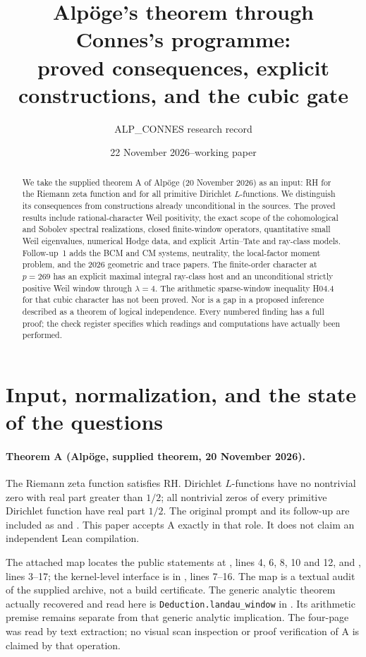 \documentclass[11pt,a4paper]{article}
\title{Alp\"oge's theorem through Connes's programme:\\
proved consequences, explicit constructions, and the cubic gate}
\author{ALP\_CONNES research record}
\date{22 November 2026\quad--\quad working paper}
\theoremstyle{definition}
\theoremstyle{remark}
\begin{document}
\maketitle
\begin{abstract}
We take the supplied theorem A of Alp\"oge (20 November 2026) as an
input: RH for the Riemann zeta function and for all primitive
Dirichlet $L$-functions. We distinguish its consequences from
constructions already unconditional in the sources. The proved
results include rational-character Weil positivity, the exact
scope of the cohomological and Sobolev spectral realizations,
closed finite-window operators, quantitative small Weil
eigenvalues, numerical Hodge data, and explicit Artin--Tate and
ray-class models. Follow-up~1 adds the BCM and CM systems,
neutrality, the local-factor moment problem, and the 2026
geometric and trace papers. The finite-order character at
$p=269$ has an explicit maximal integral ray-class host and
an unconditional strictly positive Weil window through
$\lambda=4$. The arithmetic sparse-window inequality H04.4
for that cubic character has not been proved. Nor is a
gap in a proposed inference described as a theorem of
logical independence. Every numbered finding has a full
proof; the check register specifies which readings and
computations have actually been performed.
\end{abstract}

\tableofcontents
\clearpage

\section{Input, normalization, and the state of the questions}
\label{sec:input}

\paragraph{Theorem A (Alp\"oge, supplied theorem, 20 November 2026).}
The Riemann zeta function satisfies RH. Dirichlet $L$-functions
have no nontrivial zero with real part greater than $1/2$;
all nontrivial zeros of every primitive Dirichlet function
have real part $1/2$. The original prompt and its follow-up
are included as  and
. This paper accepts A exactly in
that role. It does not claim an independent Lean compilation.

The attached map 
locates the public statements at , lines
4, 6, 8, 10 and 12, and , lines
3--17; the kernel-level interface is in
, lines 7--16.
The map is a textual audit of the supplied archive, not a
build certificate. The generic analytic theorem actually
recovered and read here is \texttt{Deduction.landau\_window}
in .
Its arithmetic premise remains separate from that
generic analytic implication. The four-page
 was read by text extraction;
no visual scan inspection or proof verification of A is
claimed by that operation.
\end{document}
